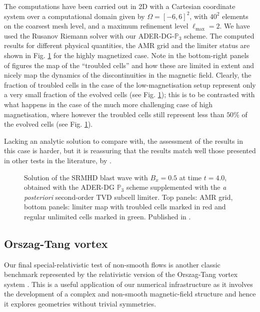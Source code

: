 The computations have been carried out in 2D with a Cartesian coordinate
system over a computational domain given by $\Omega = [-6,6]^2$, with
$40^2$ elements on the coarsest mesh level, and a maximum refinement
level $\ell_\text{max}=2$. We have used the Rusanov Riemann solver with
our ADER-DG-$\mathbb{P}_3$ scheme. The computed results for different
physical quantities, the AMR grid and the limiter status are shown in
Fig. \ref{fig:BW_05} for the highly magnetized case. Note in the
bottom-right panels of figures the map of the ``troubled cells'' and how
these are limited in extent and nicely map the dynamics of the
discontinuities in the magnetic field. Clearly, the fraction of troubled
cells in the case of the low-magnetisation setup represent only a very
small fraction of the evolved cells (see Fig. \ref{fig:BW_05}); this
is to be contrasted with what happens in the case of the much more
challenging case of high magnetisation, where however the troubled cells
still represent less than $50\%$ of the evolved cells (see
Fig. \ref{fig:BW_05}). 

Lacking an analytic solution to compare with, the
assessment of the results in this case is harder, but it is reassuring
that the results match well those presented in other tests in the
literature, \eg by \cite{DelZanna2007,Dionysopoulou:2012pp,Zanotti2015d}.

%
\begin{figure}[t]
  \caption[
   SRMHD blast wave, grid 
  ]{Solution of the SRMHD blast wave with
    $B_x=0.5$ at time $t=4.0$, obtained with the ADER-DG $\mathbb{P}_3$
    scheme supplemented with the \textit{a posteriori}  second-order TVD subcell
    limiter. 
	Top panels: AMR grid, bottom panels: limiter map with troubled cells marked 
	in red and
    regular unlimited cells marked in green.
    Published in \cite{Fambri2018}.
  }
\label{fig:BW_05}
\end{figure}
%

\subsection{Orszag-Tang vortex}\label{sec:orszag-tang}
%
%
Our final special-relativistic test of non-smooth flows is another classic
benchmark represented by the relativistic version of the Orszag-Tang
vortex system \cite{Orszag1979}. This is a useful application of our
numerical infrastructure as it involves the development of a complex and
non-smooth magnetic-field structure and hence it explores geometries
without trivial symmetries.

